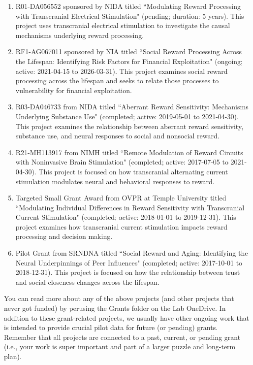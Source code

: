 \documentclass[letterpaper,11pt,oneside]{memoir}
\begin{document}
\begin{enumerate}
\item R01-DA056552 sponsored by NIDA titled ``Modulating Reward Processing with Transcranial Electrical Stimulation" (pending; duration: 5 years). This project uses transcranial electrical stimulation to investigate the causal mechanisms underlying reward processing.
\item RF1-AG067011 sponsored by NIA titled ``Social Reward Processing Across the Lifespan: Identifying Risk Factors for Financial Exploitation" (ongoing; active: 2021-04-15 to 2026-03-31). This project examines social reward processing across the lifespan and seeks to relate those processes to vulnerability for financial exploitation.
\item R03-DA046733 from NIDA titled ``Aberrant Reward Sensitivity: Mechanisms Underlying Substance Use" (completed; active: 2019-05-01 to 2021-04-30). This project examines the relationship between aberrant reward sensitivity, substance use, and neural responses to social and nonsocial reward. 
\item R21-MH113917 from NIMH titled ``Remote Modulation of Reward Circuits with Noninvasive Brain Stimulation" (completed; active: 2017-07-05 to 2021-04-30). This project is focused on how transcranial alternating current stimulation modulates neural and behavioral responses to reward. 
\item Targeted Small Grant Award from OVPR at Temple University titled ``Modulating Individual Differences in Reward Sensitivity with Transcranial Current Stimulation" (completed; active: 2018-01-01 to 2019-12-31). This project examines how transcranial current stimulation impacts reward processing and decision making.
\item Pilot Grant from SRNDNA titled ``Social Reward and Aging: Identifying the Neural Underpinnings of Peer Influences" (completed; active: 2017-10-01 to 2018-12-31). This project is focused on how the relationship between trust and social closeness changes across the lifespan. 
\end{enumerate}

You can read more about any of the above projects (and other projects that never got funded) by perusing the Grants folder on the Lab OneDrive. In addition to these grant-related projects, we usually have other ongoing work that is intended to provide crucial pilot data for future (or pending) grants. Remember that all projects are connected to a past, current, or pending grant (i.e., your work is super important and part of a larger puzzle and long-term plan).
\end{document}
